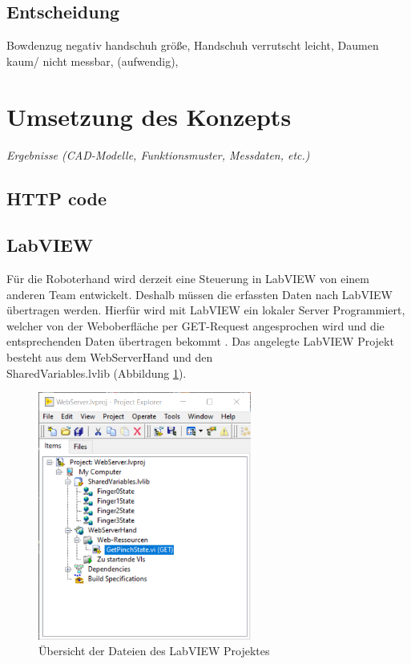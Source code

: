 \documentclass[a4paper,12pt,final]{article} %
\numberwithin{equation}{section} %
\numberwithin{figure}{section} %
\numberwithin{table}{section} %
\begin{document}
\subsection{Entscheidung}
Bowdenzug negativ handschuh größe, Handschuh verrutscht leicht, Daumen kaum/ nicht messbar, (aufwendig), 
\newpage
\section{Umsetzung des Konzepts}
\emph{Ergebnisse (CAD-Modelle, Funktionsmuster, Messdaten, etc.)}\\
\subsection{HTTP code}
\subsection{LabVIEW}
Für die Roboterhand wird derzeit eine Steuerung in LabVIEW von einem anderen Team entwickelt. 
Deshalb müssen die erfassten Daten nach LabVIEW übertragen werden. Hierfür wird mit LabVIEW ein lokaler Server Programmiert, welcher von der Weboberfläche per GET-Request angesprochen wird und die entsprechenden Daten übertragen bekommt \cite{NIwebserverTutorial}.
Das angelegte LabVIEW Projekt besteht aus dem WebServerHand und den \\SharedVariables.lvlib (Abbildung \ref{fig:ProjektExplorer}).
\begin{figure}[H]
	\begin{center}
		\includegraphics[width=7cm]{Bilder/ProjektExplorer.png}
		\caption{Übersicht der Dateien des LabVIEW Projektes}
		\label{fig:ProjektExplorer}
	\end{center}
\end{figure}
\end{document}
